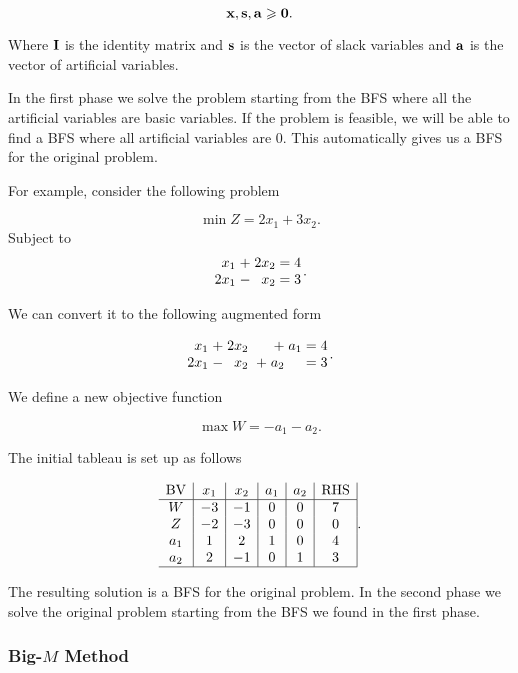 \documentclass{report}
\begin{document}
\[
	\vb{x}, \vb{s}, \vb{a} \geqslant \vb{0}
	.\]

Where $\vb{I}$ is the identity matrix and $\vb{s}$ is the vector of slack variables and $\vb{a}$ is the vector of artificial variables.

In the first phase we solve the problem starting from the BFS where all the artificial variables are basic variables. If the problem is feasible, we will be able to find a BFS where all artificial variables are 0. This automatically gives us a BFS for the original problem.

For example, consider the following problem

\[
	\min Z = 2x_1 + 3x_2
	.\]
Subject to
\[
	\arraycolsep=1.4pt
	\begin{array}{rrrrr}
		x_1  & + & 2x_2 & = & 4 \\
		2x_1 & - & x_2  & = & 3 \\
	\end{array}
	.\]

We can convert it to the following augmented form

\[
	\arraycolsep=1.4pt
	\begin{array}{rrrrrrrrrr}
		x_1  & + & 2x_2 &  &   & +   & a_1 & = & 4 \\
		2x_1 & - & x_2  &  & + & a_2 &     & = & 3
	\end{array}
	.\]

We define a new objective function

\[
	\max W = -a_1 - a_2
	.\]

The initial tableau is set up as follows

\[
	\begin{array}{c|c|c|c|c|c|c|}
		\text{BV} & x_1 & x_2 & a_1 & a_2 & \text{RHS} \\
		\hline
		W         & -3  & -1  & 0   & 0   & 7          \\
		Z         & -2  & -3  & 0   & 0   & 0          \\
		a_1       & 1   & 2   & 1   & 0   & 4          \\
		a_2       & 2   & -1  & 0   & 1   & 3          \\
		\hline
	\end{array}
	.\]

The resulting solution is a BFS for the original problem. In the second phase we solve the original problem starting from the BFS we found in the first phase.

\subsubsection{Big-$M$ Method}
\end{document}
